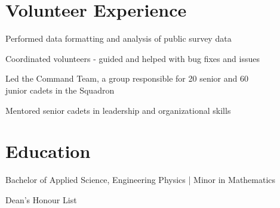 \documentclass[]{deedy-resume-openfont}
\begin{document}
    
    \section{Volunteer Experience}
    \begin{tightemize}
    \item Performed data formatting and analysis of public survey data
    \item Coordinated volunteers - guided and helped with bug fixes and issues
    \end{tightemize}
    \sectionsep
    
    \begin{tightemize}
    \item Led the Command Team, a group responsible for 20 senior and 60 \\  junior cadets in the Squadron 
    \item Mentored senior cadets in leadership and organizational skills
    \end{tightemize}
    \sectionsep
    
    \section{Education}
    \begin{tightemize}
    \item Bachelor of Applied Science, Engineering Physics | Minor in Mathematics \\
    \item Dean's Honour List
	\end{tightemize}
	\sectionsep
    
\end{document}
